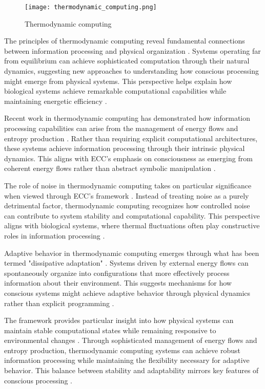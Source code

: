 \begin{refsection}
\begin{figure}[h]
    \centering
    \texttt{[image: thermodynamic\_computing.png]}

    \caption{Thermodynamic computing}
\end{figure}

The principles of thermodynamic computing reveal fundamental connections between information processing and physical organization \cite{Wolpert2019}. Systems operating far from equilibrium can achieve sophisticated computation through their natural dynamics, suggesting new approaches to understanding how conscious processing might emerge from physical systems. This perspective helps explain how biological systems achieve remarkable computational capabilities while maintaining energetic efficiency \cite{Yoshimura2021}.

Recent work in thermodynamic computing has demonstrated how information processing capabilities can arise from the management of energy flows and entropy production \cite{Bennett2019}. Rather than requiring explicit computational architectures, these systems achieve information processing through their intrinsic physical dynamics. This aligns with ECC's emphasis on consciousness as emerging from coherent energy flows rather than abstract symbolic manipulation \cite{Boyd2020}.

The role of noise in thermodynamic computing takes on particular significance when viewed through ECC's framework \cite{England2018}. Instead of treating noise as a purely detrimental factor, thermodynamic computing recognizes how controlled noise can contribute to system stability and computational capability. This perspective aligns with biological systems, where thermal fluctuations often play constructive roles in information processing \cite{Ganesh2021}.

Adaptive behavior in thermodynamic computing emerges through what has been termed "dissipative adaptation" \cite{Hinrichsen2019}. Systems driven by external energy flows can spontaneously organize into configurations that more effectively process information about their environment. This suggests mechanisms for how conscious systems might achieve adaptive behavior through physical dynamics rather than explicit programming \cite{Kolchinsky2020}.

The framework provides particular insight into how physical systems can maintain stable computational states while remaining responsive to environmental changes \cite{Maroney2019}. Through sophisticated management of energy flows and entropy production, thermodynamic computing systems can achieve robust information processing while maintaining the flexibility necessary for adaptive behavior. This balance between stability and adaptability mirrors key features of conscious processing \cite{Parrondo2017}.


\end{refsection}
